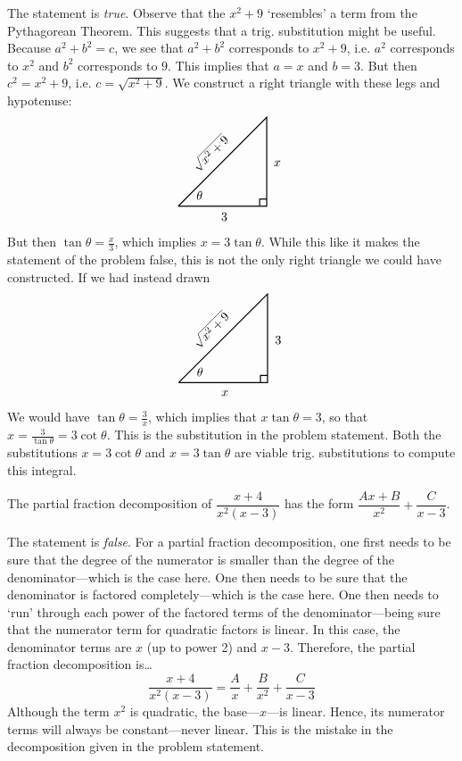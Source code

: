 \documentclass[11pt,letterpaper]{article}
\begin{document}
\sol The statement is \textit{true}. Observe that the $x^2 + 9$ `resembles' a term from the Pythagorean Theorem. This suggests that a trig. substitution might be useful. Because $a^2 + b^2= c$, we see that $a^2 + b^2$ corresponds to $x^2 + 9$, i.e. $a^2$ corresponds to $x^2$ and $b^2$ corresponds to $9$. This implies that $a= x$ and $b= 3$. But then $c^2= x^2 + 9$, i.e. $c= \sqrt{x^2 + 9}$. We construct a right triangle with these legs and hypotenuse: 
	\[
	\begin{tikzpicture}
	\draw[line width=0.03cm] (0,0) -- (2.5,0) -- (2.5,2.5) -- (0,0);
	\draw[line width=0.03cm] (2.3,0) -- (2.3,0.2) -- (2.5,0.2);
	\node at (0.6,0.3) {$\theta$};
	\node at (1.3,-0.3) {$3$};
	\node at (2.8,1.2) {$x$};
	\node[rotate = 45] at (0.9,1.5) {$\sqrt{x^2 + 9}$};
	\end{tikzpicture}
	\]
But then $\tan \theta= \tfrac{x}{3}$, which implies $x= 3 \tan \theta$. While this  like it makes the statement of the problem false, this is not the only right triangle we could have constructed. If we had instead drawn
	\[
	\begin{tikzpicture}
	\draw[line width=0.03cm] (0,0) -- (2.5,0) -- (2.5,2.5) -- (0,0);
	\draw[line width=0.03cm] (2.3,0) -- (2.3,0.2) -- (2.5,0.2);
	\node at (0.6,0.3) {$\theta$};
	\node at (1.3,-0.3) {$x$};
	\node at (2.8,1.2) {$3$};
	\node[rotate = 45] at (0.9,1.5) {$\sqrt{x^2 + 9}$};
	\end{tikzpicture}
	\]
We would have $\tan \theta= \tfrac{3}{x}$, which implies that $x \tan \theta= 3$, so that $x= \tfrac{3}{\tan \theta}= 3 \cot \theta$. This is the substitution in the problem statement. Both the substitutions $x= 3 \cot \theta$ and $x= 3 \tan \theta$ are viable trig. substitutions to compute this integral. \pvspace{1.3cm}



 The partial fraction decomposition of $\dfrac{x + 4}{x^2(x - 3)}$ has the form $\dfrac{Ax + B}{x^2} + \dfrac{C}{x - 3}$. \pspace

\sol The statement is \textit{false}. For a partial fraction decomposition, one first needs to be sure that the degree of the numerator is smaller than the degree of the denominator---which is the case here. One then needs to be sure that the denominator is factored completely---which is the case here. One then needs to `run' through each power of the factored terms of the denominator---being sure that the numerator term for quadratic factors is linear. In this case, the denominator terms are $x$ (up to power 2) and $x - 3$. Therefore, the partial fraction decomposition is\dots
	\[
	\dfrac{x + 4}{x^2(x - 3)}= \dfrac{A}{x} + \dfrac{B}{x^2} + \dfrac{C}{x - 3}
	\]
Although the term $x^2$ is quadratic, the base---$x$---is linear. Hence, its numerator terms will always be constant---never linear. This is the mistake in the decomposition given in the problem statement. \pvspace{1.3cm}
\end{document}
